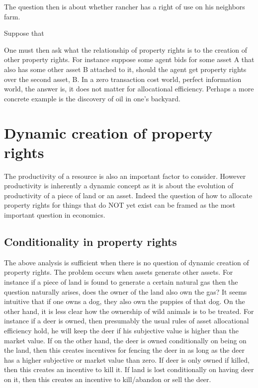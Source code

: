 \documentclass[12pt]{article}
\numberwithin{equation}{section}
\begin{document}
The question then is about whether rancher has a right of use on his neighbors farm. 

Suppose that 

One must then ask what the relationship of property rights is to the creation of other property rights. For instance suppose some agent bids for some asset A that also has some other asset B attached to it, should the agent get property rights over the second asset, B. In a zero transaction cost world, perfect information world, the answer is, it does not matter for allocational efficiency.  Perhaps a more concrete example is the discovery of oil in one's backyard. 
\newpage

\section{Dynamic creation of property rights}

The productivity of a resource is also an important factor to consider. However productivity is inherently a dynamic concept as it is about the evolution of productivity of a piece of land or an asset. Indeed the question of how to allocate property rights for things that do NOT yet exist can be framed as the most important question in economics. 



\subsection{Conditionality in property rights}

The above analysis is sufficient when there is no question of dynamic creation of property rights. The problem occurs when assets generate other assets. For instance if a piece of land is found to generate a certain natural gas then the question naturally arises, does the owner of the land also own the gas? It seems intuitive that if one owns a dog, they also own the puppies of that dog. On the other hand, it is less clear how the ownership of wild animals is to be treated. For instance if a deer is owned, then presumably the usual rules of asset allocational efficiency hold, he will keep the deer if his subjective value is higher than the market value. If on the other hand, the deer is owned conditionally on being on the land, then this creates incentives for fencing the deer in as long as the deer has a higher subjective or market value than zero. If deer is only owned if killed, then this creates an incentive to kill it. If land is lost conditionally on having deer on it, then this creates an incentive to kill/abandon or sell the deer. 
\end{document}
